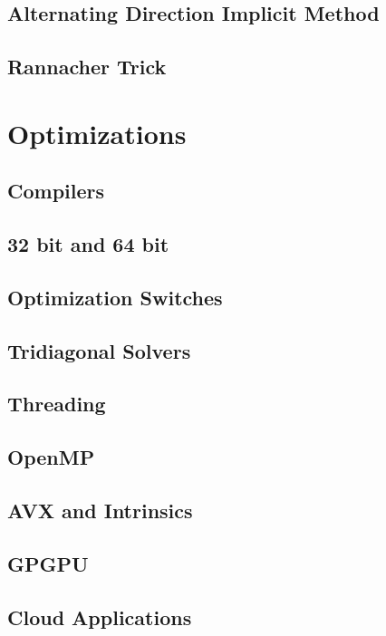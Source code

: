 \documentclass[12pt, oneside]{book}
\theoremstyle{plain}
\theoremstyle{definition}
\begin{document}
\subsection{Alternating Direction Implicit Method}

\subsection{Rannacher Trick}


\section{Optimizations}

\subsection{Compilers}
\subsection{32 bit and 64 bit}

\subsection{Optimization Switches}

\subsection{Tridiagonal Solvers}

\subsection{Threading}

\subsection{OpenMP}
\subsection{AVX and Intrinsics}
\subsection{GPGPU}
\subsection{Cloud Applications}
\end{document}
